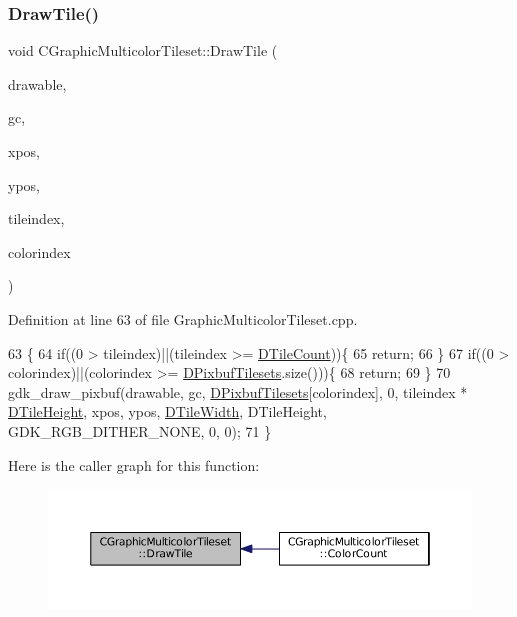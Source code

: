 \subsubsection{\texorpdfstring{Draw\+Tile()}{DrawTile()}}
{\footnotesize\ttfamily void C\+Graphic\+Multicolor\+Tileset\+::\+Draw\+Tile (\begin{DoxyParamCaption}\item[{Gdk\+Drawable $\ast$}]{drawable,  }\item[{Gdk\+GC $\ast$}]{gc,  }\item[{gint}]{xpos,  }\item[{gint}]{ypos,  }\item[{int}]{tileindex,  }\item[{int}]{colorindex }\end{DoxyParamCaption})}



Definition at line 63 of file Graphic\+Multicolor\+Tileset.\+cpp.


\begin{DoxyCode}
63                                                                                                            
                        \{
64     \textcolor{keywordflow}{if}((0 > tileindex)||(tileindex >= \hyperlink{classCGraphicTileset_a39d942b370e47f441bf97385eb1037c8}{DTileCount}))\{
65         \textcolor{keywordflow}{return};
66     \}
67     \textcolor{keywordflow}{if}((0 > colorindex)||(colorindex >= \hyperlink{classCGraphicMulticolorTileset_a30809d113b0f314944425a3c8f21408c}{DPixbufTilesets}.size()))\{
68         \textcolor{keywordflow}{return};    
69     \}
70     gdk\_draw\_pixbuf(drawable, gc, \hyperlink{classCGraphicMulticolorTileset_a30809d113b0f314944425a3c8f21408c}{DPixbufTilesets}[colorindex], 0, tileindex * 
      \hyperlink{classCGraphicTileset_af48f32e07d5fe69afd5f764318cc3244}{DTileHeight}, xpos, ypos, \hyperlink{classCGraphicTileset_a2d0c7d19865b81911a3a43d5cae50e00}{DTileWidth}, DTileHeight, GDK\_RGB\_DITHER\_NONE, 0, 0);
71 \}
\end{DoxyCode}
Here is the caller graph for this function\+:\nopagebreak
\begin{figure}[H]
\begin{center}
\leavevmode
\includegraphics[width=350pt]{classCGraphicMulticolorTileset_a17ee648ac82c48079a1853dc8a10365a_icgraph}
\end{center}
\end{figure}
\hypertarget{classCGraphicMulticolorTileset_a6ab975d5bc2ba0ed892de03bba9242cc}{}\label{classCGraphicMulticolorTileset_a6ab975d5bc2ba0ed892de03bba9242cc} 
